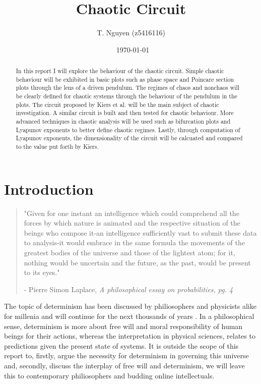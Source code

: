 \documentclass[aps,prl,reprint,10pt,amsmath,amssymb,superscriptaddress,a4paper]{revtex4-2}
\begin{document}
\title{Chaotic Circuit}

\author{T. Nguyen (z5416116)}
\date{\currenttime~\today}

\begin{abstract}
In this report I will explore the behaviour of the chaotic circuit. Simple chaotic behaviour will be exhibited in basic plots such as 
phase space and Poincare section plots through the lens of a driven pendulum. The regimes of chaos and nonchaos will be clearly defined for 
chaotic systems through the behaviour of the pendulum in the plots. The circuit proposed by Kiers et al. will be the main subject of chaotic 
investigation. A similar circuit is built and then tested for chaotic behaviour. More advanced techniques in chaotic analysis will be used such
as bifurcation plots and Lyapunov exponents to better define chaotic regimes. Lastly, through computation of Lyapunov exponents, the dimensionality 
of the circuit will be calcuated and compared to the value put forth by Kiers.
\end{abstract}

\maketitle

\section{Introduction}

\begin{quote}
\small
"Given for one instant an intelligence which could comprehend all the
forces by which nature is animated and the respective
situation of the beings who compose it-an intelligence
sufficiently vast to submit these data to analysis-it
would embrace in the same formula the movements of
the greatest bodies of the universe and those of the
lightest atom; for it, nothing would be uncertain and
the future, as the past, would be present to its eyes."
\begin{flushright}
- Pierre Simon Laplace, \textit{A philosophical essay on probabilities, pg. 4} \citep{laplacedemon}
\end{flushright}
\end{quote}

\vspace{1em}

The topic of determinism has been discussed by philiosophers and physicists alike for millenia and will continue 
for the next thousands of years \citep{sep-freedom-ancient}. In a philosophical sense, determinism is more about 
free will and moral responsibility of human beings for their actions, whereas the interpretation in physical 
sciences, relates to predictions given the present state of systems. It is outside the scope of this report to, 
firstly, argue the necessity for determinism in governing this universe and, secondly, discuss the interplay of free will 
and determinism, we will leave this to contemporary philiosophers and budding online intellectuals. 
\end{document}
